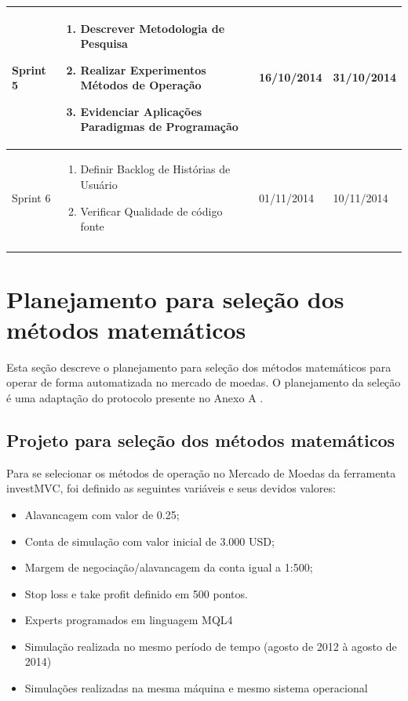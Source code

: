 \begin{center}
\begin{longtable}{  | p{2cm} | p{8cm} | p{2cm}| p{2cm} |}
    Sprint 5 & \begin{enumerate}
    \item Descrever Metodologia de Pesquisa
    \item Realizar Experimentos Métodos de Operação
    \item Evidenciar Aplicações Paradigmas de Programação
    \end{enumerate} & 16/10/2014 & 31/10/2014\\ \hline
    
    Sprint 6 & \begin{enumerate}
    \item Definir Backlog de Histórias de Usuário
    \item Verificar Qualidade de código fonte
    \end{enumerate} & 01/11/2014 & 10/11/2014\\
\label{cronograma}
\end{longtable}
\end{center}

\section{Planejamento para seleção dos métodos matemáticos}

Esta seção descreve o planejamento para seleção dos métodos matemáticos para operar de forma automatizada no mercado de moedas. O planejamento da seleção é uma adaptação do protocolo presente no Anexo A \cite{brereton}.

\subsection{Projeto para seleção dos métodos matemáticos}

Para se selecionar os métodos de operação no Mercado de Moedas da ferramenta investMVC, foi definido as seguintes variáveis e seus devidos valores:

\begin{itemize}
\item Alavancagem com valor de 0.25;
\item Conta de simulação com valor inicial de 3.000 USD;
\item Margem de negociação/alavancagem da conta igual a 1:500;
\item Stop loss e take profit definido em 500 pontos.
\item Experts programados em linguagem MQL4
\item Simulação realizada no mesmo período de tempo (agosto de 2012 à agosto de 2014)
\item Simulações realizadas na mesma máquina e mesmo sistema operacional
\end{itemize}


